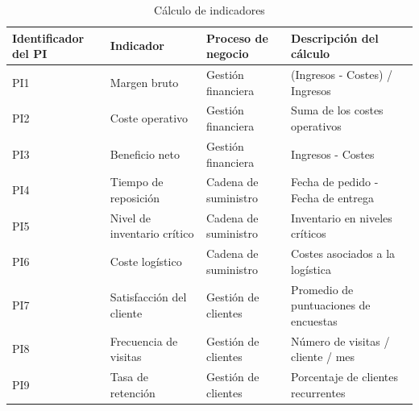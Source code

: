 \documentclass[12pt]{opticajnl}
\begin{document}
\begin{table}[H]
\centering
\begin{tabular}{|p{2cm}|p{4cm}|p{4cm}|p{7cm}|}
\hline
\textbf{Identificador del PI} & \textbf{Indicador} & \textbf{Proceso de negocio} & \textbf{Descripción del cálculo} \\ \hline
PI1                          & Margen bruto       & Gestión financiera          & (Ingresos - Costes) / Ingresos \\ \hline
PI2                          & Coste operativo    & Gestión financiera          & Suma de los costes operativos \\ \hline
PI3                          & Beneficio neto     & Gestión financiera          & Ingresos - Costes \\ \hline
PI4                          & Tiempo de reposición & Cadena de suministro       & Fecha de pedido - Fecha de entrega \\ \hline
PI5                          & Nivel de inventario crítico & Cadena de suministro & Inventario en niveles críticos \\ \hline
PI6                          & Coste logístico    & Cadena de suministro        & Costes asociados a la logística \\ \hline
PI7                          & Satisfacción del cliente & Gestión de clientes     & Promedio de puntuaciones de encuestas \\ \hline
PI8                          & Frecuencia de visitas & Gestión de clientes       & Número de visitas / cliente / mes \\ \hline
PI9                          & Tasa de retención  & Gestión de clientes         & Porcentaje de clientes recurrentes \\ \hline
\end{tabular}
\caption{Cálculo de indicadores}
\end{table}
\end{document}
